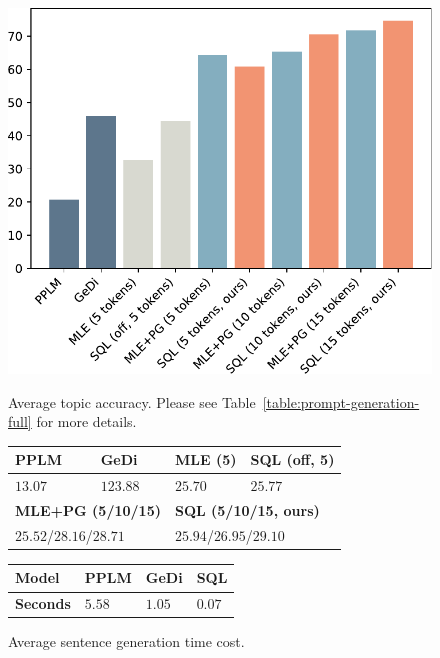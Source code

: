 \begin{figure}[t]
    \centering
    \begin{minipage}{.49\textwidth}
        \centering
        \includegraphics[width=0.75\linewidth]{figures/20210527.prompt-generation.pdf}
        \vspace{-7pt}
        \caption{Average topic accuracy. Please see Table~\ref{table:prompt-generation-full} for more details.}
        \label{fig:prompt-generation-topic}
\end{minipage}%
\hfill
\begin{minipage}{0.49\textwidth}
\centering
\small
\begin{tabular}{@{}llll@{}}
\toprule
\textbf{PPLM} & \textbf{GeDi} & \textbf{MLE (5)} & \textbf{SQL (off, 5)} \\
\midrule
$13.07$ & $123.88$ & $25.70$ & $25.77$ \\
\midrule
\multicolumn{2}{l}{\textbf{MLE+PG (5/10/15)}} & \multicolumn{2}{l}{\textbf{SQL (5/10/15, ours)}} \\
\midrule
\multicolumn{2}{l}{$25.52$/$28.16$/$28.71$} & \multicolumn{2}{l}{$25.94$/$26.95$/$29.10$} \\
\bottomrule
\end{tabular}
\vspace{-7pt}
\vspace{-5pt}
\label{table:prompt-generation}

\vspace{9pt}

\centering
\small
\begin{tabular}{p{0.79cm}p{0.6cm}p{0.6cm}p{0.6cm}}
\toprule
\textbf{Model} & PPLM & GeDi & SQL \\
\midrule
\textbf{Seconds} & $5.58$ & $1.05$ & $0.07$ \\
\bottomrule
\end{tabular}
\vspace{-7pt}
\caption{Average sentence generation time cost.}
\vspace{-7pt}
\label{table:prompt-generation-speed}
\end{minipage}
\vspace{-7pt}
\end{figure}


